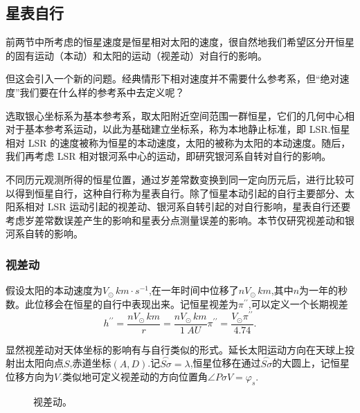 \documentclass[11pt, a4paper, oneside]{ctexart}
\numberwithin{equation}{subsection}
\begin{document}
\subsection{星表自行}
前两节中所考虑的恒星速度是恒星相对太阳的速度，很自然地我们希望区分开恒星的固有运动（本动）和太阳的运动（视差动）对自行的影响。

但这会引入一个新的问题。经典情形下相对速度并不需要什么参考系，但“绝对速度”我们要在什么样的参考系中去定义呢？

选取银心坐标系为基本参考系，取太阳附近空间范围一群恒星，它们的几何中心相对于基本参考系运动，以此为基础建立坐标系，称为本地静止标准，即 LSR.恒星相对 LSR 的速度被称为恒星的本动速度，太阳的被称为太阳的本动速度。随后，我们再考虑 LSR 相对银河系中心的运动，即研究银河系自转对自行的影响。

不同历元观测所得的恒星位置，通过岁差常数变换到同一定向历元后，进行比较可以得到恒星自行，这种自行称为星表自行。除了恒星本动引起的自行主要部分、太阳系相对 LSR 运动引起的视差动、银河系自转引起的对自行影响，星表自行还要考虑岁差常数误差产生的影响和星表分点测量误差的影响。本节仅研究视差动和银河系自转的影响。

\subsubsection{视差动}
假设太阳的本动速度为$V_\odot\,\unit{km\cdot{}s^{-1}}$,在一年时间中位移了$nV_\odot\,\unit{km}$,其中$n$为一年的秒数。此位移会在恒星的自行中表现出来。记恒星视差为$\pi^{\prime\prime}$,可以定义一个长期视差
\begin{equation}
h^{\prime\prime}=\frac{nV_{\odot}\,\unit{km}}{r}=\frac{nV_{\odot}\,\unit{km}}{\qty{1}{AU}}\pi^{\prime\prime}=\frac{V_{\odot}\pi^{\prime\prime}}{4.74}.
\end{equation}

显然视差动对天体坐标的影响有与自行类似的形式。延长太阳运动方向在天球上投射出太阳向点$S$,赤道坐标$\left(A,D\right)$.记$\overset{\frown}{S\sigma}=\lambda$,恒星位移在通过$\overset{\frown}{S\sigma}$的大圆上，记恒星位移方向为$V$.类似地可定义视差动的方向位置角$\angle{P\sigma V}=\varphi_{s}$.
\begin{figure}[!htp]
\centering
{}
\captionsetup{justification=raggedright, singlelinecheck=false}
\caption{视差动。}
\label{视差动。}
\end{figure}
\end{document}
